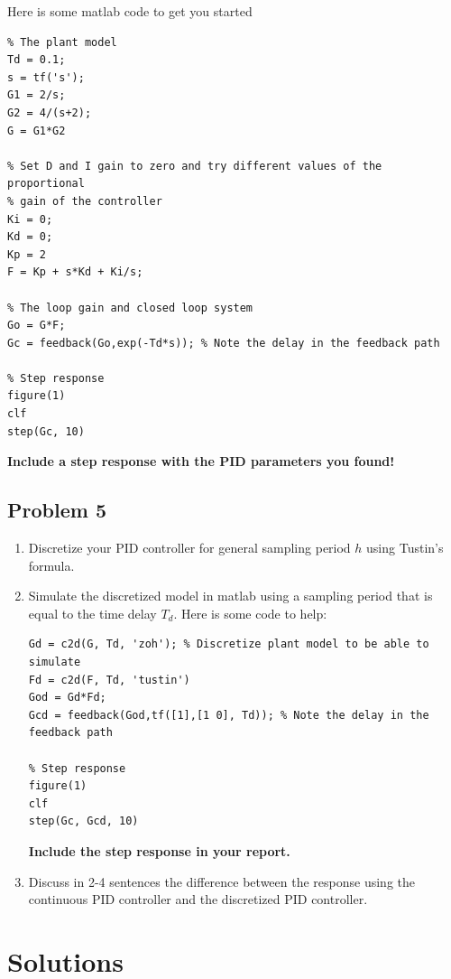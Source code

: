 \documentclass{scrartcl}
\begin{document}
Here is some matlab code to get you started
\begin{verbatim}
% The plant model
Td = 0.1;
s = tf('s');
G1 = 2/s;
G2 = 4/(s+2);
G = G1*G2

% Set D and I gain to zero and try different values of the proportional 
% gain of the controller
Ki = 0;
Kd = 0;
Kp = 2
F = Kp + s*Kd + Ki/s;

% The loop gain and closed loop system
Go = G*F;
Gc = feedback(Go,exp(-Td*s)); % Note the delay in the feedback path

% Step response
figure(1)
clf
step(Gc, 10)
\end{verbatim}

\textbf{Include a step response with the PID parameters you found!}

\subsection*{Problem 5}
\label{sec:orgheadline6}
\begin{enumerate}
\item Discretize your PID controller for general sampling period \(h\) using Tustin's formula.
\item Simulate the discretized model in matlab using a sampling period that is equal to the time delay \(T_d\). Here is some code to help:
\begin{verbatim}
Gd = c2d(G, Td, 'zoh'); % Discretize plant model to be able to simulate
Fd = c2d(F, Td, 'tustin')
God = Gd*Fd;
Gcd = feedback(God,tf([1],[1 0], Td)); % Note the delay in the feedback path

% Step response
figure(1)
clf
step(Gc, Gcd, 10)
\end{verbatim}
\textbf{Include the step response in your report.}
\item Discuss in 2-4 sentences the difference between the response using the continuous PID controller and the discretized PID controller.
\end{enumerate}
\section*{Solutions}
\label{sec:orgheadline16}
\end{document}
